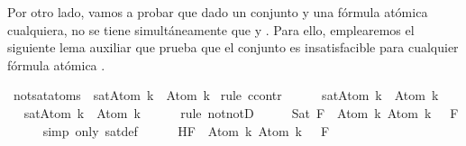 \begin{isabellebody}
\begin{isamarkuptext}
Por otro lado, vamos a probar que dado un conjunto  y  una fórmula atómica 
  cualquiera, no se tiene simultáneamente que  y . Para ello, emplearemos el 
  siguiente lema auxiliar que prueba que el conjunto  es insatisfacible para cualquier 
  fórmula atómica .%
\end{isamarkuptext}\isamarkuptrue%
\isamarkupfalse%
\ not{\isacharunderscore}sat{\isacharunderscore}atoms{\isacharcolon}\ {\isachardoublequoteopen}{\isasymnot}\ sat{\isacharparenleft}{\isacharbraceleft}Atom\ k{\isacharcomma}\ \isactrlbold {\isasymnot}\ {\isacharparenleft}Atom\ k{\isacharparenright}{\isacharbraceright}{\isacharparenright}{\isachardoublequoteclose}\isanewline
%
\isadelimproof
%
\endisadelimproof
%
\isatagproof
{}\isamarkupfalse%
\ {\isacharparenleft}rule\ ccontr{\isacharparenright}\isanewline
\ \ \isamarkupfalse%
\ {\isachardoublequoteopen}{\isasymnot}\ {\isasymnot}\ sat{\isacharparenleft}{\isacharbraceleft}Atom\ k{\isacharcomma}\ \isactrlbold {\isasymnot}\ {\isacharparenleft}Atom\ k{\isacharparenright}{\isacharbraceright}{\isacharparenright}{\isachardoublequoteclose}\isanewline
\ \ \isamarkupfalse%
\ \isamarkupfalse%
\ {\isachardoublequoteopen}sat{\isacharparenleft}{\isacharbraceleft}Atom\ k{\isacharcomma}\ \isactrlbold {\isasymnot}\ {\isacharparenleft}Atom\ k{\isacharparenright}{\isacharbraceright}{\isacharparenright}{\isachardoublequoteclose}\isanewline
\ \ \ \ \isamarkupfalse%
\ {\isacharparenleft}rule\ notnotD{\isacharparenright}\isanewline
\ \ \isamarkupfalse%
\ \isamarkupfalse%
\ Sat{\isacharcolon}{\isachardoublequoteopen}{\isasymexists}{\isasymA}{\isachardot}\ {\isasymforall}F\ {\isasymin}\ {\isacharbraceleft}Atom\ k{\isacharcomma}\ \isactrlbold {\isasymnot}{\isacharparenleft}Atom\ k{\isacharparenright}{\isacharbraceright}{\isachardot}\ {\isasymA}\ {\isasymTurnstile}\ F{\isachardoublequoteclose}\isanewline
\ \ \ \ \isamarkupfalse%
\ {\isacharparenleft}simp\ only{\isacharcolon}\ sat{\isacharunderscore}def{\isacharparenright}\isanewline
\ \ \isamarkupfalse%
\ {\isasymA}\ \ H{\isacharcolon}{\isachardoublequoteopen}{\isasymforall}F\ {\isasymin}\ {\isacharbraceleft}Atom\ k{\isacharcomma}\ \isactrlbold {\isasymnot}{\isacharparenleft}Atom\ k{\isacharparenright}{\isacharbraceright}{\isachardot}\ {\isasymA}\ {\isasymTurnstile}\ F{\isachardoublequoteclose}\isanewline

\end{isabellebody}
